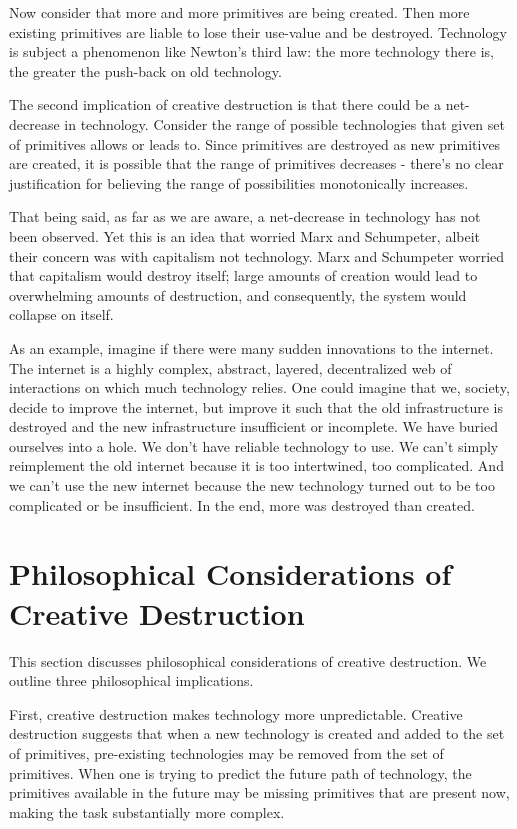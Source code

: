 \documentclass[11pt]{article}
\begin{document}
Now consider that more and more primitives are being created. 
Then more existing primitives are liable to lose their use-value and be destroyed.
Technology is subject a phenomenon like Newton's third law: the more technology there is, the greater the push-back on old technology. 

The second implication of creative destruction is that there could be a net-decrease in technology. 
Consider the range of possible technologies that given set of primitives allows or leads to.
Since primitives are destroyed as new primitives are created, it is possible that the range of primitives decreases - there's no clear justification for believing the range of possibilities monotonically increases.

That being said, as far as we are aware, a net-decrease in technology has not been observed.
Yet this is an idea that worried Marx and Schumpeter, albeit their concern was with capitalism not technology.
Marx and Schumpeter worried that capitalism would destroy itself; large amounts of creation would lead to overwhelming amounts of destruction, and consequently, the system would collapse on itself.

As an example, imagine if there were many sudden innovations to the internet.
The internet is a highly complex, abstract, layered, decentralized web of interactions on which much technology relies.
One could imagine that we, society, decide to improve the internet, but improve it such that the old infrastructure is destroyed and the new infrastructure insufficient or incomplete.
We have buried ourselves into a hole.
We don't have reliable technology to use. 
We can't simply reimplement the old internet because it is too intertwined, too complicated.
And we can't use the new internet because the new technology turned out to be too complicated or be insufficient.
In the end, more was destroyed than created.

\section{Philosophical Considerations of Creative Destruction}
This section discusses philosophical considerations of creative destruction.
We outline three philosophical implications.

First, creative destruction makes technology more unpredictable.
Creative destruction suggests that when a new technology is created and added to the set of primitives, pre-existing technologies may be removed from the set of primitives.
When one is trying to predict the future path of technology, the primitives available in the future may be missing primitives that are present now, making the task substantially more complex.
\end{document}
